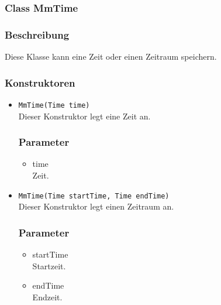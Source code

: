 \documentclass[a4paper]{scrreprt}
\begin{document}

\subsubsection{Class MmTime}
\subsubsection*{Beschreibung}
Diese Klasse kann eine Zeit oder einen Zeitraum speichern.

\subsubsection*{Konstruktoren}
\begin{addmargin}[25pt]{0pt}
\begin{itemize}

\item \texttt{MmTime(Time time)}\\
	Dieser Konstruktor legt eine Zeit an.

	\subsubsection*{Parameter}
	\begin{itemize}
	\item time \\
		Zeit.
	\end{itemize}

\item \texttt{MmTime(Time startTime, Time endTime)}\\
	Dieser Konstruktor legt einen Zeitraum an.

	\subsubsection*{Parameter}
	\begin{itemize}
	\item startTime \\
	Startzeit.
	\item endTime \\
	Endzeit.
	\end{itemize}

\end{itemize}
\end{addmargin}
\end{document}

